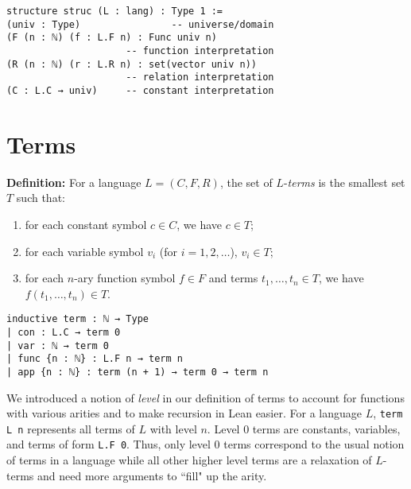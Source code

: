 \documentclass[landscape]{sciposter}
\newcommand{\eion}[1]{{\color{cyan}\bfseries [#1]}}
\begin{document}
\begin{multicols}{3}
\begin{lstlisting}
structure struc (L : lang) : Type 1 :=
(univ : Type)                -- universe/domain
(F (n : ℕ) (f : L.F n) : Func univ n)
                     -- function interpretation
(R (n : ℕ) (r : L.R n) : set(vector univ n))
                     -- relation interpretation
(C : L.C → univ)     -- constant interpretation
\end{lstlisting}

\section*{Terms}

\textbf{Definition:} For a language $L = (C, F, R)$, the set of $L$-\textit{terms} is the smallest set $T$ such that:
\begin{enumerate}[label*=\roman*)]
    \item for each constant symbol $c \in C$, we have $c \in T$;
    \item for each variable symbol $v_i$ (for $i=1,2,\ldots$), $v_i \in T$;
    \item for each $n$-ary function symbol $f \in F$ and terms $t_1,\dots,t_{n} \in T$, we have $f(t_1,\dots,t_{n}) \in T$.
\end{enumerate}

\vspace{7mm}

\begin{lstlisting}
inductive term : ℕ → Type
| con : L.C → term 0
| var : ℕ → term 0
| func {n : ℕ} : L.F n → term n
| app {n : ℕ} : term (n + 1) → term 0 → term n
\end{lstlisting}


We introduced a notion of {\sl level} in our definition of terms to account for functions with various arities and to make recursion in Lean easier. For a language $L$, \texttt{term L n} represents all terms of $L$ with level $n$.
Level \(0\) terms are constants, variables, and terms of form \texttt{L.F 0}.
Thus, only level \(0\) terms correspond to the usual notion of terms in a language while all other higher level terms are a relaxation of \(L\)-terms and need more arguments to ``fill" up the arity.


\end{multicols}
\end{document}

